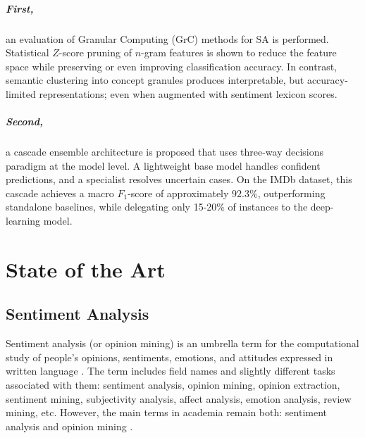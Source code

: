 \documentclass[a4paper,twoside,12pt]{book}
\newcommand{\zscore}{Z}
\begin{document}
\paragraph{First,} an evaluation of Granular Computing (GrC) methods for SA is performed. Statistical $\zscore$-score pruning of $n$-gram features is shown to reduce the feature space while preserving or even improving classification accuracy. In contrast, semantic clustering into concept granules produces interpretable, but accuracy-limited representations; even when augmented with sentiment lexicon scores. 

\paragraph{Second,} a cascade ensemble architecture is proposed that uses three-way decisions paradigm at the model level. A lightweight base model handles confident predictions, and a specialist resolves uncertain cases. On the IMDb dataset, this cascade achieves a macro $F_1$-score of approximately $92.3\%$, outperforming standalone baselines, while delegating only 15-20\% of instances to the deep-learning model.

\chapter{State of the Art} \label{chap:state-of-the-art}
\section{Sentiment Analysis}

Sentiment analysis (or opinion mining) is an umbrella term for the computational study of people's opinions, sentiments, emotions, and attitudes expressed in written language \cite{Liu2012sentiment}. The term includes field names and slightly different tasks associated with them: sentiment analysis, opinion mining, opinion extraction, sentiment mining, subjectivity analysis, affect analysis, emotion analysis, review mining, etc. \cite{Liu2012sentiment} However, the main terms in academia remain both: sentiment analysis and opinion mining \cite{Liu2012sentiment}.
\end{document}
